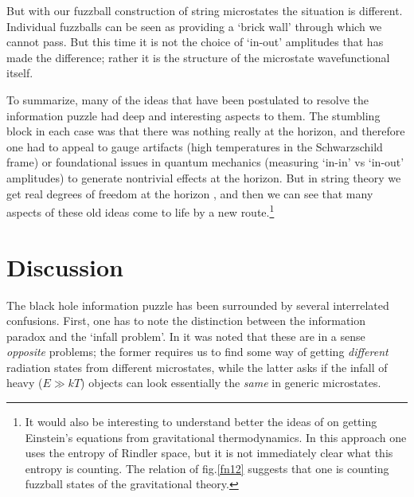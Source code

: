 \documentclass[11pt]{article}
\begin{document}
But with our fuzzball construction of string microstates the situation is different. Individual fuzzballs can be seen as providing a `brick wall' through which we cannot pass. But this time it is not the choice of `in-out' amplitudes that has made the difference; rather it is the structure of the microstate wavefunctional itself.

To summarize, many of the ideas that have been postulated to resolve the information puzzle had deep and interesting aspects to them. The stumbling block in each case was that there was nothing really at the horizon, and therefore one had to appeal to gauge artifacts (high temperatures in the Schwarzschild frame) or foundational issues in quantum mechanics (measuring `in-in' vs `in-out' amplitudes) to generate nontrivial effects at the horizon. But in string theory we get real degrees of freedom at the horizon \cite{membrane}, and then we can see that many aspects of these old ideas come to life by a new route.\footnote{It would also be interesting to understand better the ideas of \cite{jacobson} on getting Einstein's equations from gravitational thermodynamics. In this approach one uses the entropy of Rindler space, but it is not immediately clear what this entropy is counting. The relation of fig.\ref{fn12} suggests that one is counting fuzzball states of the gravitational theory.}
 
 
\section{Discussion}

The black hole information puzzle has been surrounded by several interrelated confusions. First, one has to note the distinction between the information paradox and the `infall problem'. In \cite{mathurrecent} it was noted that these are in a sense {\it opposite} problems; the former requires us to find some way of getting {\it different} radiation states from different microstates, while the latter asks if the infall of heavy ($E\gg kT$) objects can look essentially the {\it same} in generic microstates. 
\end{document}
